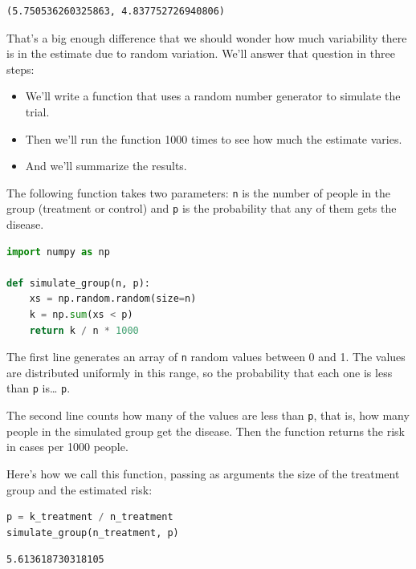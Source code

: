\begin{lstlisting}[style=output]
(5.750536260325863, 4.837752726940806)
\end{lstlisting}

That's a big enough difference that we should wonder how much
variability there is in the estimate due to random variation. We'll
answer that question in three steps:

\begin{itemize}
\item
  We'll write a function that uses a random number generator to simulate
  the trial.
\item
  Then we'll run the function 1000 times to see how much the estimate
  varies.
\item
  And we'll summarize the results.
\end{itemize}

The following function takes two parameters: \passthrough{\lstinline!n!}
is the number of people in the group (treatment or control) and
\passthrough{\lstinline!p!} is the probability that any of them gets the
disease.

\begin{lstlisting}[language=Python,style=source]
import numpy as np

def simulate_group(n, p):
    xs = np.random.random(size=n)
    k = np.sum(xs < p)
    return k / n * 1000
\end{lstlisting}

The first line generates an array of \passthrough{\lstinline!n!} random
values between 0 and 1. The values are distributed uniformly in this
range, so the probability that each one is less than
\passthrough{\lstinline!p!} is\ldots{} \passthrough{\lstinline!p!}.

The second line counts how many of the values are less than
\passthrough{\lstinline!p!}, that is, how many people in the simulated
group get the disease. Then the function returns the risk in cases per
1000 people.

Here's how we call this function, passing as arguments the size of the
treatment group and the estimated risk:

\begin{lstlisting}[language=Python,style=source]
p = k_treatment / n_treatment
simulate_group(n_treatment, p)
\end{lstlisting}

\begin{lstlisting}[style=output]
5.613618730318105
\end{lstlisting}

